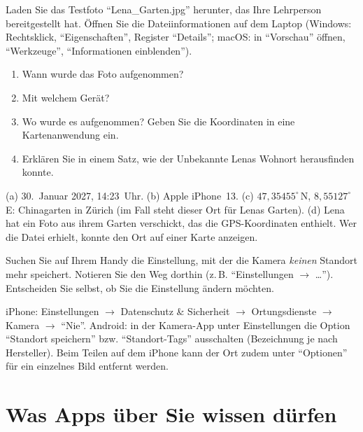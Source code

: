 \begin{myexercise}\label{ex:testfoto}
	Laden Sie das Testfoto \enquote{Lena\_Garten.jpg} herunter, das Ihre Lehrperson bereitgestellt hat.
	Öffnen Sie die Dateiinformationen auf dem Laptop
	(Windows: Rechtsklick, \enquote{Eigenschaften}, Register \enquote{Details}; macOS: in \enquote{Vorschau} öffnen, \enquote{Werkzeuge}, \enquote{Informationen einblenden}).
	\begin{enumerate}
		\item Wann wurde das Foto aufgenommen?
		\item Mit welchem Gerät?
		\item Wo wurde es aufgenommen? Geben Sie die Koordinaten in eine Kartenanwendung ein.
		\item Erklären Sie in einem Satz, wie der Unbekannte Lenas Wohnort herausfinden konnte.
	\end{enumerate}
	\begin{myanswer}
		(a) 30.~Januar 2027, 14:23~Uhr. (b) Apple iPhone~13.
		(c) $47{,}35455^\circ$\,N, $8{,}55127^\circ$\,E: Chinagarten in Zürich (im Fall steht dieser Ort für Lenas Garten).
		(d) Lena hat ein Foto aus ihrem Garten verschickt, das die \acrshort{GPS}-Koordinaten enthielt. Wer die Datei erhielt, konnte den Ort auf einer Karte anzeigen.
	\end{myanswer}
\end{myexercise}

\begin{myexercise}
	Suchen Sie auf Ihrem Handy die Einstellung, mit der die Kamera \emph{keinen} Standort mehr speichert.
	Notieren Sie den Weg dorthin (z.\,B. \enquote{Einstellungen $\rightarrow$ \dots}).
	Entscheiden Sie selbst, ob Sie die Einstellung ändern möchten.
	\schreibzeile
	\schreibzeile
	\begin{myanswer}
		iPhone: Einstellungen $\rightarrow$ Datenschutz \& Sicherheit $\rightarrow$ Ortungsdienste $\rightarrow$ Kamera $\rightarrow$ \enquote{Nie}.
		Android: in der Kamera-App unter Einstellungen die Option \enquote{Standort speichern} bzw. \enquote{Standort-Tags} ausschalten (Bezeichnung je nach Hersteller).
		Beim Teilen auf dem iPhone kann der Ort zudem unter \enquote{Optionen} für ein einzelnes Bild entfernt werden.
	\end{myanswer}
\end{myexercise}

\section{Was Apps über Sie wissen dürfen}

